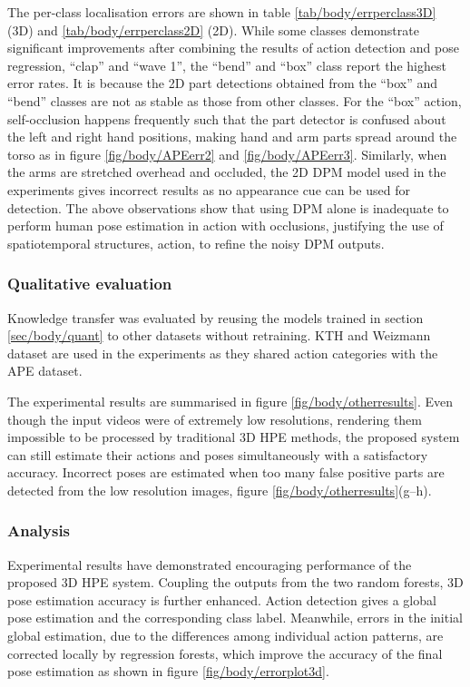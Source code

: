 



The per-class localisation errors are shown in table \ref{tab/body/errperclass3D} (3D) and \ref{tab/body/errperclass2D} (2D). While some classes demonstrate significant improvements after combining the results of action detection and pose regression, \eg ``clap'' and ``wave 1'', the ``bend'' and ``box'' class report the highest error rates. It is because the 2D part detections obtained from the ``box'' and ``bend'' classes are not as stable as those from other classes. For the ``box'' action, self-occlusion happens frequently such that the part detector is confused about the left and right hand positions, making hand and arm parts spread around the torso as in figure \ref{fig/body/APEerr2} and \ref{fig/body/APEerr3}. 
Similarly, when the arms are stretched overhead and occluded, the 2D DPM model used in the experiments gives incorrect results as no appearance cue can be used for detection. The above observations show that using DPM alone is inadequate to perform human pose estimation in action with occlusions, justifying the use of spatiotemporal structures, \ie action, to refine the noisy DPM outputs.  



\subsubsection{Qualitative evaluation}

Knowledge transfer was evaluated by reusing the models trained in section \ref{sec/body/quant} to other datasets without retraining.
KTH \cite{Schuldt2004} and Weizmann \cite{Gorelick2007} dataset are used in the experiments as they shared action categories with the APE dataset. 

The experimental results are summarised in figure \ref{fig/body/otherresults}. Even though the input videos were of extremely low resolutions, rendering them impossible to be processed by traditional 3D HPE methods, the proposed system can still estimate their actions and poses simultaneously with a satisfactory accuracy. 
Incorrect poses are estimated when too many false positive parts are detected from the low resolution images, \eg figure \ref{fig/body/otherresults}(g--h). 

\subsubsection{Analysis}
Experimental results have demonstrated encouraging performance of the proposed 3D HPE system.  
Coupling the outputs from the two random forests, 3D pose estimation accuracy is further enhanced. Action detection gives a global pose estimation and the corresponding class label. Meanwhile, errors in the initial global estimation, due to the differences among individual action patterns, are corrected locally by regression forests, which improve the accuracy of the final pose estimation as shown in figure \ref{fig/body/errorplot3d}. 

